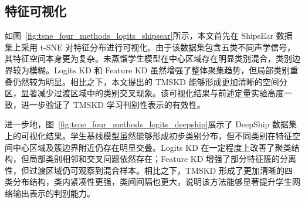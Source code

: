 \documentclass[a4paper, 12pt]{article}
\begin{document}




\subsection{特征可视化}
如图~\ref{fig:tsne_four_methods_logits_shipsear}所示，本文首先在 ShipsEar 数据集上采用 t-SNE 对特征分布进行可视化。由于该数据集包含五类不同声学信号，其特征空间本身更为复杂。未蒸馏学生模型在中心区域存在明显类别混合，类别边界较为模糊。Logits KD 和 Feature KD 虽然增强了整体聚集趋势，但局部类别重叠仍然较为明显。相比之下，本文提出的 TMSKD 能够形成更加清晰的空间分区，显著减少过渡区域中的类别交叉现象。该可视化结果与前述定量实验高度一致，进一步验证了 TMSKD 学习判别性表示的有效性。

进一步地，图~\ref{fig:tsne_four_methods_logits_deepship}展示了 DeepShip 数据集上的可视化结果。学生基线模型虽然能够形成初步类别分布，但不同类别在特征空间中心区域及簇边界附近仍存在明显交叠。Logits KD 在一定程度上改善了聚类结构，但局部类别相邻和交叉问题依然存在；Feature KD 增强了部分特征簇的分离性，但过渡区域仍可观察到混合样本。相比之下，TMSKD 形成了更加清晰的四类分布结构，类内紧凑性更强，类间间隔也更大，说明该方法能够显著提升学生网络输出表示的判别能力。
\end{document}
